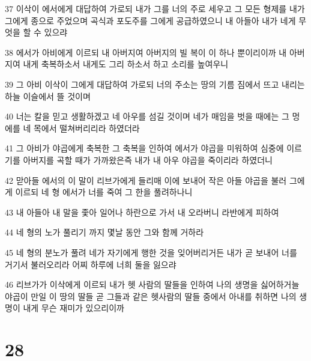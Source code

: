 \par 37 이삭이 에서에게 대답하여 가로되 내가 그를 너의 주로 세우고 그 모든 형제를 내가 그에게 종으로 주었으며 곡식과 포도주를 그에게 공급하였으니 내 아들아 내가 네게 무엇을 할 수 있으랴
\par 38 에서가 아비에게 이르되 내 아버지여 아버지의 빌 복이 이 하나 뿐이리이까 내 아버지여 내게 축복하소서 내게도 그리 하소서 하고 소리를 높여우니
\par 39 그 아비 이삭이 그에게 대답하여 가로되 너의 주소는 땅의 기름 짐에서 뜨고 내리는 하늘 이슬에서 뜰 것이며
\par 40 너는 칼을 믿고 생활하겠고 네 아우를 섬길 것이며 네가 매임을 벗을 때에는 그 멍에를 네 목에서 떨쳐버리리라 하였더라
\par 41 그 아비가 야곱에게 축복한 그 축복을 인하여 에서가 야곱을 미워하여 심중에 이르기를 아버지를 곡할 때가 가까왔은즉 내가 내 아우 야곱을 죽이리라 하였더니
\par 42 맏아들 에서의 이 말이 리브가에게 들리매 이에 보내어 작은 아들 야곱을 불러 그에게 이르되 네 형 에서가 너를 죽여 그 한을 풀려하나니
\par 43 내 아들아 내 말을 좇아 일어나 하란으로 가서 내 오라버니 라반에게 피하여
\par 44 네 형의 노가 풀리기 까지 몇날 동안 그와 함께 거하라
\par 45 네 형의 분노가 풀려 네가 자기에게 행한 것을 잊어버리거든 내가 곧 보내어 너를 거기서 불러오리라 어찌 하루에 너희 둘을 잃으랴
\par 46 리브가가 이삭에게 이르되 내가 헷 사람의 딸들을 인하여 나의 생명을 싫어하거늘 야곱이 만일 이 땅의 딸들 곧 그들과 같은 헷사람의 딸들 중에서 아내를 취하면 나의 생명이 내게 무슨 재미가 있으리이까

\chapter{28}

